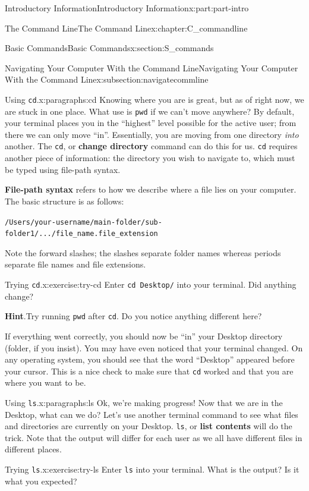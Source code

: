 \documentclass[oneside,10pt,]{book}
\newcommand{\blocktitlefont}{\relax}
\newcommand{\mono}[1]{\texttt{#1}}
\newcommand{\terminology}[1]{\textbf{#1}}
\begin{document}
\begin{partptx}{Introductory Information}{}{Introductory Information}{}{}{x:part:part-intro}
\begin{chapterptx}{The Command Line}{}{The Command Line}{}{}{x:chapter:C_commandline}
\begin{sectionptx}{Basic Commands}{}{Basic Commands}{}{}{x:section:S_commands}
\begin{subsectionptx}{Navigating Your Computer With the Command Line}{}{Navigating Your Computer With the Command Line}{}{}{x:subsection:navigatecommline}
\begin{paragraphs}{Using \mono{cd}.}{x:paragraphs:cd}
Knowing where you are is great, but as of right now, we are stuck in one place. What use is \mono{pwd} if we can't move anywhere? By default, your terminal places you in the ``highest'' level possible for the active user; from there we can only move ``in''. Essentially, you are moving from one directory \emph{into} another. The \mono{cd}, or \terminology{change directory} command can do this for us. \mono{cd} requires another piece of information: the directory you wish to navigate to, which must be typed using file-path syntax.%
\par
\terminology{File-path syntax} refers to how we describe where a file lies on your computer. The basic structure is as follows:%
\par
\mono{/Users/your-username/main-folder/sub-folder1/.../file\_name.file\_extension}%
\par
Note the forward slashes; the slashes separate folder names whereas periods separate file names and file extensions.%
\begin{inlineexercise}{Trying \mono{cd}.}{x:exercise:try-cd}%
Enter \mono{cd Desktop/} into your terminal. Did anything change?%
\par\smallskip%
\noindent\textbf{\blocktitlefont Hint}.\hypertarget{g:hint:idp615426968}{}\quad{}Try running \mono{pwd} after \mono{cd}. Do you notice anything different here?%
\end{inlineexercise}%
If everything went correctly, you should now be ``in'' your Desktop directory (folder, if you insist). You may have even noticed that your terminal changed. On any operating system, you should see that the word ``Desktop'' appeared before your cursor. This is a nice check to make sure that \mono{cd} worked and that you are where you want to be.%
\end{paragraphs}%
\begin{paragraphs}{Using \mono{ls}.}{x:paragraphs:ls}%
\index{command line!\mono{ls}}%
\index{\mono{ls}}%
%
Ok, we're making progress! Now that we are in the Desktop, what can we do? Let's use another terminal command to see what files and directories are currently on your Desktop. \mono{ls}, or \terminology{list contents} will do the trick. Note that the output will differ for each user as we all have different files in different places.%
\begin{inlineexercise}{Trying \mono{ls}.}{x:exercise:try-ls}%
Enter \mono{ls} into your terminal. What is the output? Is it what you expected?%
\end{inlineexercise}%

\end{paragraphs}
\end{subsectionptx}
\end{sectionptx}
\end{chapterptx}
\end{partptx}
\end{document}
